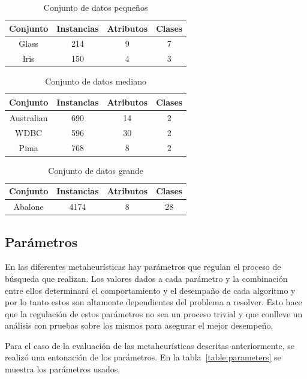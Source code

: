 \documentclass{ci5652}
\begin{document}
\begin{table}[!h]
	\centering
	\begin{tabular}{c c c c}
	\hline
	Conjunto & Instancias & Atributos & Clases \\
	\hline
	Glass & 214 & 9 & 7 \\
	Iris & 150 & 4 & 3 \\
	\end{tabular}
	\caption{Conjunto de datos pequeños}
	\label{table:small-dataset}
\end{table}

\begin{table}[!h]
	\centering
	\begin{tabular}{c c c c}
	\hline
	Conjunto & Instancias & Atributos & Clases \\
	\hline
	Australian & 690 & 14 & 2 \\
	WDBC & 596 & 30 & 2 \\
	Pima & 768 & 8 & 2 \\
	\end{tabular}
	\caption{Conjunto de datos mediano}
	\label{table:medium-dataset}
\end{table}


\begin{table}[!h]
	\centering
	\begin{tabular}{c c c c}
	\hline
	Conjunto & Instancias & Atributos & Clases \\
	\hline
	Abalone & 4174 & 8 & 28 \\
	\end{tabular}
	\caption{Conjunto de datos grande}
	\label{table:large-dataset}
\end{table}

\subsection{Parámetros}
En las diferentes metaheurísticas hay parámetros que regulan el proceso de búsqueda que realizan. Los valores dados a cada parámetro y la combinación entre ellos determinará el comportamiento y el desempaño de cada algoritmo y por lo tanto estos son altamente dependientes del problema a resolver. Esto hace que la regulación de estos parámetros no sea un proceso trivial y que conlleve un análisis con pruebas sobre los mismos para asegurar el mejor desempeño.

	Para el caso de la evaluación de las metaheurísticas descritas anteriormente, se realizó una entonación de los parámetros. En la tabla~\ref{table:parameters} se muestra los parámetros usados.  
\end{document}
